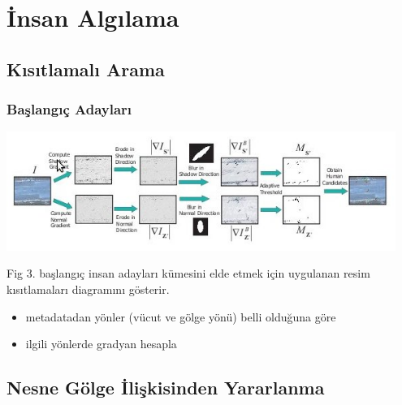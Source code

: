 \documentclass{beamer}
\begin{document}
\section{İnsan Algılama}
\subsection{Kısıtlamalı Arama}

\begin{frame}
	\frametitle{Başlangıç Adayları}

	\includegraphics[width=0.95\textwidth]{img/fig3.jpg}\label{fig:baslangic-adaylari}

	Fig 3. başlangıç insan adayları kümesini elde etmek için uygulanan resim
	kısıtlamaları diagramını gösterir.

	\begin{itemize}
		\item metadatadan yönler (vücut ve gölge yönü) belli olduğuna göre
		\item ilgili yönlerde gradyan hesapla
	\end{itemize}
\end{frame}

\subsection{Nesne Gölge İlişkisinden Yararlanma}
\end{document}
